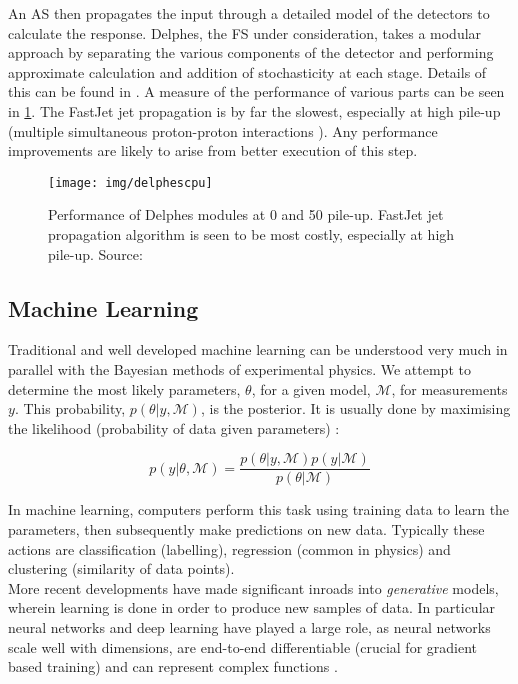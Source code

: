 \documentclass{report}
\begin{document}
An AS then propagates the input through a detailed model of the detectors to calculate the response. Delphes, the FS under consideration, takes a modular approach by separating the various components of the detector and performing approximate calculation and addition of stochasticity at each stage. Details of this can be found in \cite{delphes}. A measure of the performance of various parts can be seen in \cref{fig:delphescpu}. The FastJet jet propagation \cite{fastjet} is by far the slowest, especially at high pile-up (multiple simultaneous proton-proton interactions \cite{marshall}). Any performance improvements are likely to arise from better execution of this step. \\ 


\begin{figure}[H]
	\centering
	\texttt{[image: img/delphescpu]}
	
	\caption{Performance of Delphes modules at 0 and 50 pile-up. FastJet jet propagation algorithm is seen to be most costly, especially at high pile-up. Source: \cite{delphes}}
	\label{fig:delphescpu}
	
\end{figure}

 
\subsection{Machine Learning}
\label{sec:ml}

Traditional and well developed machine learning can be understood very much in parallel with the Bayesian methods of experimental physics. We attempt to determine the most likely parameters, $\theta$, for a given model, $\mathcal{M}$, for measurements $y$. This probability, $p(\theta|y, \mathcal{M})$, is the posterior. It is usually done by maximising the likelihood (probability of data given parameters) \cite{data}:

\[
p(y|\theta, \mathcal{M}) = \frac{p(\theta|y, \mathcal{M})p(y|\mathcal{M})}{p(\theta|\mathcal{M})}
\]

In machine learning, computers perform this task using training data to learn the parameters, then subsequently make predictions on new data. Typically these actions are classification (labelling), regression (common in physics) and clustering (similarity of data points). \\

More recent developments have made significant inroads into \textit{generative} models, wherein learning is done in order to produce new samples of data. In particular neural networks and deep learning have played a large role, as neural networks scale well with dimensions, are end-to-end differentiable (crucial for gradient based training) and can represent complex functions \cite{deepgen}.\\
\end{document}
